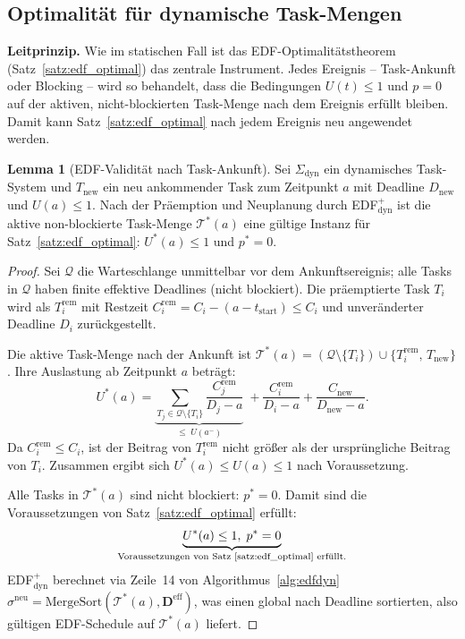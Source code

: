 ﻿\documentclass[a4paper,12pt]{article}
\theoremstyle{definition}
\newtheorem{lemma}{Lemma}
\begin{document}
	\subsection{Optimalität für dynamische Task-Mengen}

	\textbf{Leitprinzip.} Wie im statischen Fall ist das EDF-Optimalitätstheorem
	(Satz~\ref{satz:edf_optimal}) das zentrale Instrument. Jedes Ereignis --
	Task-Ankunft oder Blocking -- wird so behandelt, dass die Bedingungen
	$U(t) \le 1$ und $p = 0$ auf der aktiven, nicht-blockierten Task-Menge
	nach dem Ereignis erfüllt bleiben. Damit kann Satz~\ref{satz:edf_optimal}
	nach jedem Ereignis neu angewendet werden.

	\begin{lemma}[EDF-Validität nach Task-Ankunft]
		\label{lem:ankunft_konsistenz}
		Sei $\Sigma_{\mathrm{dyn}}$ ein dynamisches Task-System und $T_{\text{new}}$
		ein neu ankommender Task zum Zeitpunkt $a$ mit Deadline $D_{\text{new}}$
		und $U(a) \le 1$. Nach der Präemption und Neuplanung durch
		EDF$^+_{\mathrm{dyn}}$ ist die aktive non-blockierte Task-Menge
		$\mathcal{T}^*(a)$ eine gültige Instanz für
		Satz~\ref{satz:edf_optimal}: $U^*(a) \le 1$ und $p^* = 0$.
	\end{lemma}

	\begin{proof}
		Sei $\mathcal{Q}$ die Warteschlange unmittelbar vor dem Ankunftsereignis;
		alle Tasks in $\mathcal{Q}$ haben finite effektive Deadlines (nicht blockiert).
		Die präemptierte Task $T_i$ wird als $T_i^{\text{rem}}$ mit Restzeit
		$C_i^{\text{rem}} = C_i - (a - t_{\text{start}}) \le C_i$ und
		unveränderter Deadline $D_i$ zurückgestellt.

		Die aktive Task-Menge nach der Ankunft ist
		$\mathcal{T}^*(a) = (\mathcal{Q} \setminus \{T_i\}) \cup \{T_i^{\text{rem}},\, T_{\text{new}}\}$.
		Ihre Auslastung ab Zeitpunkt $a$ beträgt:
		\[
		U^*(a) = \underbrace{\sum_{T_j \in \mathcal{Q} \setminus \{T_i\}} \frac{C_j^{\text{rem}}}{D_j - a}}_{{\le}\; U(a^-)}\;
		+ \frac{C_i^{\text{rem}}}{D_i - a}
		+ \frac{C_{\text{new}}}{D_{\text{new}} - a}.
		\]
		Da $C_i^{\text{rem}} \le C_i$, ist der Beitrag von $T_i^{\text{rem}}$ nicht
		grö\ss{}er als der ursprüngliche Beitrag von $T_i$. Zusammen ergibt sich
		$U^*(a) \le U(a) \le 1$ nach Voraussetzung.

		Alle Tasks in $\mathcal{T}^*(a)$ sind nicht blockiert: $p^* = 0$.
		Damit sind die Voraussetzungen von Satz~\ref{satz:edf_optimal} erfüllt:
		\[
		\underbrace{U^*(a) \le 1,\; p^* = 0}_{\text{Voraussetzungen von Satz~\ref{satz:edf_optimal} erfüllt.}}
		\]
		EDF$^+_{\mathrm{dyn}}$ berechnet via Zeile~14 von Algorithmus~\ref{alg:edfdyn}
		$\sigma^{\text{neu}} = \mathrm{MergeSort}(\mathcal{T}^*(a), \mathbf{D}^{\text{eff}})$,
		was einen global nach Deadline sortierten, also gültigen EDF-Schedule auf
		$\mathcal{T}^*(a)$ liefert.
	\end{proof}
\end{document}
